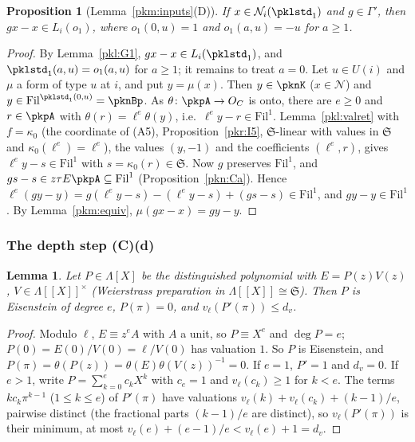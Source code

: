 \documentclass[10pt]{amsart}
\newtheorem{proposition}[theorem]{Proposition}
\newtheorem{lemma}[theorem]{Lemma}
\theoremstyle{definition}
\theoremstyle{remark}
\begin{document}
\begin{proposition}[Lemma~\ref{pkm:inputs}(D)]\label{pkl:D}
If $x\in\mathcal N_i(\pklstd_1)$ and $g\in\Gamma'$, then $gx-x\in L_i(o_1)$, where $o_1(0,u)=1$ and $o_1(a,u)=-u$
for $a\ge1$.
\end{proposition}

\begin{proof}
By Lemma~\ref{pkl:G1}, $gx-x\in L_i(\pklstd_1)$, and $\pklstd_1(a,u)=o_1(a,u)$ for $a\ge1$; it remains to treat
$a=0$. Let $u\in U(i)$ and $\mu$ a form of type $u$ at $i$, and put $y=\mu(x)$. Then $y\in\pknK$ ($x\in\mathcal N$)
and $y\in\mathrm{Fil}^{\pklstd_1(0,u)}=\pknBp$. As $\theta\colon\pkpA\to O_C$ is onto, there are $e\ge0$ and
$r\in\pkpA$ with $\theta(r)=\ell^e\theta(y)$, i.e.\ $\ell^ey-r\in\mathrm{Fil}^1$. Lemma~\ref{pkl:valret} with
$f=\kappa_0$ (the coordinate of (A5), Proposition~\ref{pkr:I5}, $\mathfrak S$-linear with values in $\mathfrak S$
and $\kappa_0(\ell^e)=\ell^e$), the values $(y,-1)$ and the coefficients $(\ell^e,r)$, gives $\ell^ey-s\in
\mathrm{Fil}^1$ with $s=\kappa_0(r)\in\mathfrak S$. Now $g$ preserves $\mathrm{Fil}^1$, and $gs-s\in z\tau E\pkpA
\subseteq\mathrm{Fil}^1$ (Proposition~\ref{pkn:Ca}). Hence $\ell^e(gy-y)=g(\ell^ey-s)-(\ell^ey-s)+(gs-s)\in
\mathrm{Fil}^1$, and $gy-y\in\mathrm{Fil}^1$. By Lemma~\ref{pkm:equiv}, $\mu(gx-x)=gy-y$.
\end{proof}

\subsubsection{The depth step (C)(d)}\label{pkl:ss-Cd}

\begin{lemma}\label{pkl:different}
Let $P\in\Lambda[X]$ be the distinguished polynomial with $E=P(z)V(z)$, $V\in\Lambda[[X]]^\times$ (Weierstrass
preparation in $\Lambda[[X]]\cong\mathfrak S$). Then $P$ is Eisenstein of degree $e$, $P(\pi)=0$, and
$v_\ell(P'(\pi))\le d_v$.
\end{lemma}

\begin{proof}
Modulo $\ell$, $E\equiv z^eA$ with $A$ a unit, so $P\equiv X^e$ and $\deg P=e$; $P(0)=E(0)/V(0)=\ell/V(0)$ has
valuation $1$. So $P$ is Eisenstein, and $P(\pi)=\theta(P(z))=\theta(E)\theta(V(z))^{-1}=0$. If $e=1$, $P'=1$
and $d_v=0$. If $e>1$, write $P=\sum_{k=0}^ec_kX^k$ with $c_e=1$ and $v_\ell(c_k)\ge1$ for $k<e$. The terms
$kc_k\pi^{k-1}$ ($1\le k\le e$) of $P'(\pi)$ have valuations $v_\ell(k)+v_\ell(c_k)+(k-1)/e$, pairwise distinct
(the fractional parts $(k-1)/e$ are distinct), so $v_\ell(P'(\pi))$ is their minimum, at most
$v_\ell(e)+(e-1)/e<v_\ell(e)+1=d_v$.
\end{proof}
\end{document}

